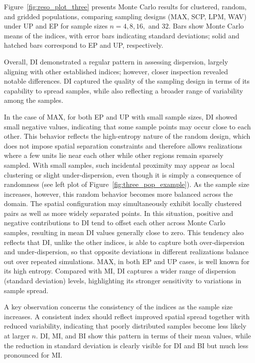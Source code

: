 \documentclass[12pt]{imsart}
\theoremstyle{plain}
\theoremstyle{remark}
\begin{document}
Figure~\ref{fig:reso_plot_three} presents Monte Carlo results for clustered, random, and gridded populations, comparing sampling designs (MAX, SCP, LPM, WAV) under UP and EP for sample sizes $n=4,8,16,$ and $32$. Bars show Monte Carlo means of the indices, with error bars indicating standard deviations; solid and hatched bars correspond to EP and UP, respectively.

Overall, DI demonstrated a regular pattern in assessing dispersion, largely aligning with other established indices; however, closer inspection revealed notable differences. DI captured the quality of the sampling design in terms of its capability to spread samples, while also reflecting a broader range of variability among the samples.

In the case of MAX, for both EP and UP with small sample sizes, DI showed small negative values, indicating that some sample points may occur close to each other. This behavior reflects the high-entropy nature of the random design, which does not impose spatial separation constraints and therefore allows realizations where a few units lie near each other while other regions remain sparsely sampled. With small samples, such incidental proximity may appear as local clustering or slight under-dispersion, even though it is simply a consequence of randomness (see left plot of Figure~\ref{fig:three_pop_example}). As the sample size increases, however, this random behavior becomes more balanced across the domain. The spatial configuration may simultaneously exhibit locally clustered pairs as well as more widely separated points. In this situation, positive and negative contributions to DI tend to offset each other across
Monte Carlo samples, resulting in mean DI values generally close to zero. This tendency also reflects that DI, unlike the other indices, is able to capture both over-dispersion and under-dispersion, so that opposite deviations in different realizations balance out over repeated simulations. MAX, in both EP and UP cases, is well known for its high entropy. Compared with MI, DI captures a wider range of dispersion (standard deviation) levels, highlighting its stronger sensitivity to variations in sample spread.

A key observation concerns the consistency of the indices as the sample size increases. A consistent index should reflect improved spatial spread together with reduced variability, indicating that poorly distributed samples become less likely at larger \(n\). DI, MI, and BI show this pattern in terms of their mean values, while the reduction in standard deviation is clearly visible for DI and BI but much less pronounced for MI.
\end{document}
